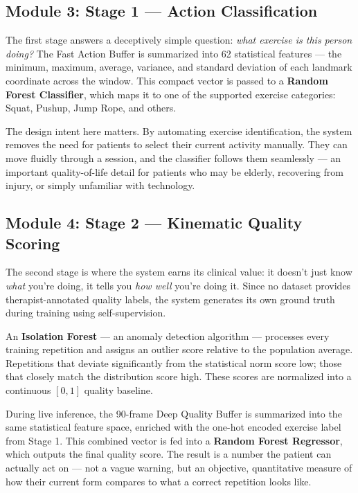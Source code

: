 \documentclass[10pt, twocolumn, a4paper]{article}
\begin{document}
\subsection{Module 3: Stage 1 --- Action Classification}
The first stage answers a deceptively simple question: \textit{what exercise is this person doing?} The Fast Action Buffer is summarized into 62 statistical features — the minimum, maximum, average, variance, and standard deviation of each landmark coordinate across the window. This compact vector is passed to a \textbf{Random Forest Classifier}, which maps it to one of the supported exercise categories: Squat, Pushup, Jump Rope, and others.

The design intent here matters. By automating exercise identification, the system removes the need for patients to select their current activity manually. They can move fluidly through a session, and the classifier follows them seamlessly — an important quality-of-life detail for patients who may be elderly, recovering from injury, or simply unfamiliar with technology.

\subsection{Module 4: Stage 2 --- Kinematic Quality Scoring}
The second stage is where the system earns its clinical value: it doesn't just know \textit{what} you're doing, it tells you \textit{how well} you're doing it. Since no dataset provides therapist-annotated quality labels, the system generates its own ground truth during training using self-supervision.

An \textbf{Isolation Forest} — an anomaly detection algorithm — processes every training repetition and assigns an outlier score relative to the population average. Repetitions that deviate significantly from the statistical norm score low; those that closely match the distribution score high. These scores are normalized into a continuous $[0, 1]$ quality baseline.

During live inference, the 90-frame Deep Quality Buffer is summarized into the same statistical feature space, enriched with the one-hot encoded exercise label from Stage 1. This combined vector is fed into a \textbf{Random Forest Regressor}, which outputs the final quality score. The result is a number the patient can actually act on — not a vague warning, but an objective, quantitative measure of how their current form compares to what a correct repetition looks like.
\end{document}
